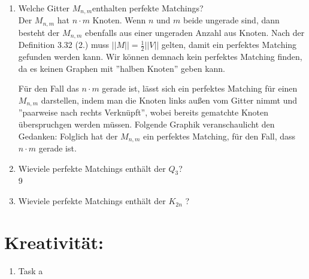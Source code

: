 \begin{enumerate}[label=(\alph*)]
        \item 
        Welche Gitter $M_{n,m} $enthalten perfekte Matchings? \\
        Der $M_{n,m}$ hat $n \cdot m$ Knoten. Wenn $n$ und $m$ beide ungerade sind, dann besteht der $M_{n,m}$ ebenfalls aus einer ungeraden Anzahl aus Knoten. Nach der Definition 3.32 (2.) muss $||M|| = \frac{1}{2} ||V||$ gelten, damit ein perfektes Matching gefunden werden kann. Wir können demnach kein perfektes Matching finden, da es keinen Graphen mit ''halben Knoten'' geben kann. \par
        Für den Fall das $n \cdot m$ gerade ist, lässt sich ein perfektes Matching für einen $M_{n,m}$ darstellen, indem man die Knoten links außen vom Gitter nimmt und ''paarweise nach rechts Verknüpft'', wobei bereits gematchte Knoten überspruchgen werden müssen. Folgende Graphik veranschaulicht den Gedanken:
        Folglich hat der $M_{n,m}$ ein perfektes Matching, für den Fall, dass $n \cdot m$ gerade ist.
        
        \item
        Wieviele perfekte Matchings enthält der $Q_3$? \\
        9
        \item 
        Wieviele perfekte Matchings enthält der $K_{2n}$ ?
        
    \end{enumerate}
    \section*{Kreativität:}
    \begin{enumerate}[label=(\alph*)]
    	\item Task a
    \end{enumerate}
